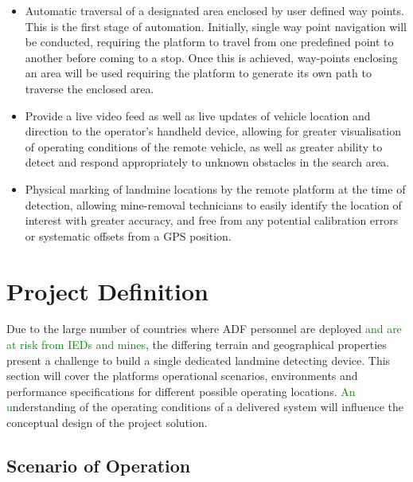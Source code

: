 \documentclass[main.tex]{subfiles}
\begin{document}
\begin{itemize}
\item Automatic traversal of a designated area enclosed by user defined way points. This is the first stage of automation. Initially, single way point navigation will be conducted, requiring the platform to travel from one predefined point to another before coming to a stop. Once this is achieved, way-points enclosing an area will be used requiring the platform to generate its own path to traverse the enclosed area.
\item Provide a live video feed as well as live updates of vehicle location and direction to the operator's handheld device, allowing for greater visualisation of operating conditions of the remote vehicle, as well as greater ability to detect and respond appropriately to unknown obstacles in the search area.
\item Physical marking of landmine locations by the remote platform at the time of detection, allowing mine-removal technicians to easily identify the location of interest with greater accuracy, and free from any potential calibration errors or systematic offsets from a GPS position.
\end{itemize}

\section{Project Definition}
Due to the large number of countries where ADF personnel are deployed \textcolor{green}{and are at risk from IEDs and mines}, the differing terrain and geographical properties present a challenge to build a single dedicated landmine detecting device. This section will cover the platforms operational scenarios, environments and performance specifications for different possible operating locations. \textcolor{green}{An u}nderstanding of the operating conditions of a delivered system will influence the conceptual design of the project solution.
\subsection{Scenario of Operation}
\end{document}
